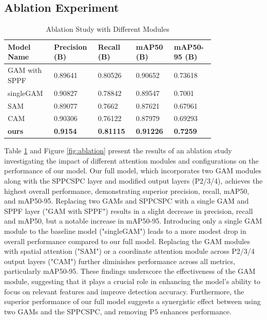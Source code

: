 \documentclass[10pt]{article}
\begin{document}
\subsection{Ablation Experiment}
\begin{table}[]
    \centering
    \caption{Ablation Study with Different Modules}
    \label{tab:gam-ablation}
    \begin{tabular}{p{0.16\linewidth}p{0.16\linewidth}p{0.16\linewidth}p{0.16\linewidth}p{0.16\linewidth}}
    \toprule
    Model Name                  & Precision (B) & Recall (B) & mAP50 (B) & mAP50-95 (B) \\ \midrule
    GAM with SPPF & 0.89641       & 0.80526    & 0.90652   & 0.73618     \\
    singleGAM & 0.90827       & 0.78842    & 0.89547   & 0.7001      \\
    SAM         & 0.89077       & 0.7662     & 0.87621   & 0.67961      \\

    CAM         & 0.90306       & 0.76122    & 0.87979   & 0.69293     \\
    \textbf{ours}        & \textbf{0.9154}        & \textbf{0.81115}    & \textbf{0.91226}   & \textbf{0.7259}       \\
     \bottomrule
    \end{tabular}
    \end{table}
    Table \ref{tab:gam-ablation} and Figure \ref{fig:ablation} present the results of an ablation study investigating the impact of different attention modules and configurations on the performance of our model. Our full model, which incorporates two GAM modules along with the SPPCSPC layer and modified output layers (P2/3/4), achieves the highest overall performance, demonstrating superior precision, recall, mAP50, and mAP50-95. Replacing two GAMs and SPPCSPC with a single GAM and SPPF layer ("GAM with SPPF") results in a slight decrease in precision, recall and mAP50, but a notable increase in mAP50-95. Introducing only a single GAM module to the baseline model ("singleGAM") leads to a more modest drop in overall performance compared to our full model. Replacing the GAM modules with spatial attention ("SAM") or a coordinate attention module across P2/3/4 output layers ("CAM") further diminishes performance across all metrics, particularly mAP50-95. These findings underscore the effectiveness of the GAM module, suggesting that it plays a crucial role in enhancing the model's ability to focus on relevant features and improve detection accuracy. Furthermore, the superior performance of our full model suggests a synergistic effect between using two GAMs and the SPPCSPC, and removing P5 enhances performance.
\end{document}
